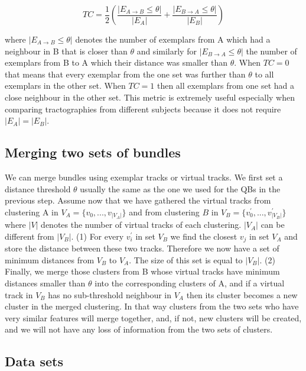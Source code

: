 \documentclass[preprint,authoryear,a4paper,10pt,onecolumn]{elsarticle}
\begin{document}
\begin{equation}
TC=\frac{1}{2}\left(\frac{|E_{A\rightarrow B}\leq \theta |}{|E_{A}|}+\frac{|E_{B\rightarrow A}\leq \theta |}{|E_{B}|}\right)\label{eq:TC}
\end{equation}


where $|E_{A\rightarrow B}\leq \theta |$ denotes the number of
exemplars from A which had a neighbour in B that is closer than
$\theta$ and similarly for $|E_{B\rightarrow A}\leq
\theta |$ the number of exemplars from B to A which their
distance was smaller than $\theta$. When $TC=0$ that means
that every exemplar from the one set was further than $\theta$
to all exemplars in the other set. When $TC=1$ then all exemplars from
one set had a close neighbour in the other set. This metric is extremely
useful especially when comparing tractographies from different subjects
because it does not require $|E_{A}|=|E_{B}|$.

\subsection{Merging two sets of bundles\label{sub:merging}}

We can merge bundles using exemplar tracks or virtual tracks. We first
set a distance threshold $\theta$ usually the same as the one we used
for the QBs in the previous step. Assume now that we have gathered the
virtual tracks from clustering A in $V_{A}=\{v_{0},...,v_{|V_{A}|}\}$
and from clustering $B$ in $V_{B}=\{v_{0}^{'},...,v_{|V_{B}|}^{'}\}$
where $|V|$ denotes the number of virtual tracks of each clustering.
$|V_{A}|$ can be different from $|V_{B}|$. (1) For every $v_{i}^{'}$ in set
$V_{B}$ we find the closest $v_{j}$ in set $V_{A}$ and store the
distance between these two tracks. Therefore we now have a set of
minimum distances from $V_{B}$ to $V_{A}$. The size of this set is equal
to $|V_{B}|$. (2) Finally, we merge those clusters from B whose virtual
tracks have minimum distances smaller than $\theta$ into the
corresponding clusters of A, and if a virtual track in $V_{B}$ has no
sub-threshold neighbour in $V_{A}$ then its cluster becomes a new
cluster in the merged clustering. In that way clusters from the two sets
who have very similar features will merge together, and, if not, new
clusters will be created, and we will not have any loss of information
from the two sets of clusters.

\subsection{\label{sub:QB-Data-sets}Data sets}
\end{document}
